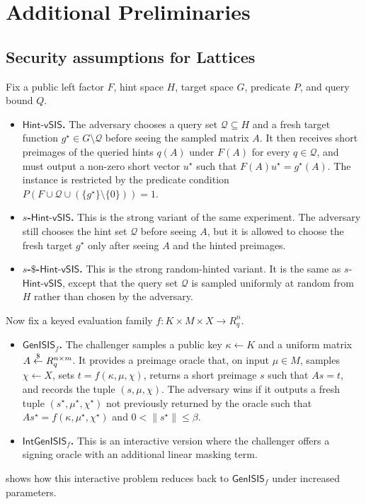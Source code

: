 \section{Additional Preliminaries}
\label{app:defs}

\subsection{Security assumptions for Lattices}\label{app:assumptions lattices}

Fix a public left factor \(F\), hint space \(H\), target space \(G\), predicate \(P\), and query bound \(Q\).
\begin{itemize}[leftmargin=1.25em]
  \item \textbf{\(\mathsf{Hint\mbox{-}vSIS}\).} The adversary chooses a query set \(\mathcal{Q}\subseteq H\) and a fresh
  target function \(g^\star\in G\setminus \mathcal{Q}\) before seeing the sampled matrix \(A\). It then receives short
  preimages of the queried hints \(q(A)\) under \(F(A)\) for every \(q\in\mathcal{Q}\), and must output a non-zero short
  vector \(u^\star\) such that \(F(A)u^\star=g^\star(A)\). The instance is restricted by the predicate condition
  \(P(F\cup \mathcal{Q}\cup(\{g^\star\}\setminus\{0\}))=1\).
  \item \textbf{\(s\)-\(\mathsf{Hint\mbox{-}vSIS}\).} This is the strong variant of the same experiment. The adversary still
  chooses the hint set \(\mathcal{Q}\) before seeing \(A\), but it is allowed to choose the fresh target \(g^\star\) only
  after seeing \(A\) and the hinted preimages.
  \item \textbf{\(s\)-\(\$\)-\(\mathsf{Hint\mbox{-}vSIS}\).} This is the strong random-hinted variant. It is the same as
  \(s\)-\(\mathsf{Hint\mbox{-}vSIS}\), except that the query set \(\mathcal{Q}\) is sampled uniformly at random from \(H\)
  rather than chosen by the adversary.
\end{itemize}

Now fix a keyed evaluation family \(f:K\times M\times X\to R_q^n\).
\begin{itemize}[leftmargin=1.25em]
  \item \textbf{\(\mathsf{GenISIS}_f\).} The challenger samples a public key \(\kappa\gets K\) and a uniform matrix
  \(A\overset{\$}{\leftarrow} R_q^{n\times m}\). It provides a preimage oracle that, on input \(\mu\in M\), samples \(\chi\gets X\),
  sets \(t=f(\kappa,\mu,\chi)\), returns a short preimage \(s\) such that \(As=t\), and records the tuple
  \((s,\mu,\chi)\). The adversary wins if it outputs a fresh tuple \((s^\star,\mu^\star,\chi^\star)\) not previously
  returned by the oracle such that \(As^\star=f(\kappa,\mu^\star,\chi^\star)\) and \(0<\|s^\star\|\le \beta\).
  \item \textbf{\(\mathsf{IntGenISIS}_f\).} This is an interactive version where the challenger offers a
  signing oracle with an additional linear masking term.
\end{itemize}
\cite{PKC:DKLW25} shows how this interactive problem reduces
  back to \(\mathsf{GenISIS}_f\) under increased parameters.


